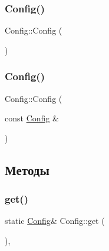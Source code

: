 \mbox{\label{class_config_abd0c571c116924871e30444b192b792a}} 
\subsubsection{\texorpdfstring{Config()}{Config()}\hspace{0.1cm}{\footnotesize\ttfamily [3/4]}}
{\footnotesize\ttfamily Config\+::\+Config (\begin{DoxyParamCaption}{ }\end{DoxyParamCaption})\hspace{0.3cm}{\ttfamily [private]}}

\mbox{\label{class_config_add59e40b81cf0ffb43571bc201781dc0}} 
\subsubsection{\texorpdfstring{Config()}{Config()}\hspace{0.1cm}{\footnotesize\ttfamily [4/4]}}
{\footnotesize\ttfamily Config\+::\+Config (\begin{DoxyParamCaption}\item[{const \hyperlink{class_config}{Config} \&}]{ }\end{DoxyParamCaption})\hspace{0.3cm}{\ttfamily [private]}}



\subsection{Методы}
\mbox{\label{class_config_a5154d96acc76c1fae8c564f3705fe197}} 
\subsubsection{\texorpdfstring{get()}{get()}\hspace{0.1cm}{\footnotesize\ttfamily [1/2]}}
{\footnotesize\ttfamily static \hyperlink{class_config}{Config}\& Config\+::get (\begin{DoxyParamCaption}{ }\end{DoxyParamCaption})\hspace{0.3cm}{\ttfamily [inline]}, {\ttfamily [static]}}

